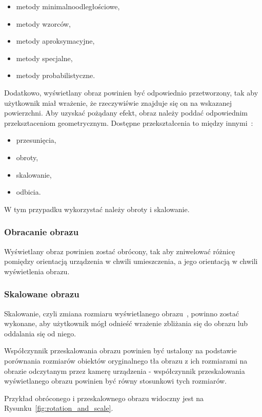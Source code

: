 \begin{itemize}
 \item metody minimalnoodległościowe,
 \item metody wzorców,
 \item metody aproksymacyjne,
 \item metody specjalne,
 \item metody probabilistyczne.
\end{itemize}


Dodatkowo, wyświetlany obraz powinien być odpowiednio przetworzony, tak aby użytkownik miał wrażenie, że rzeczywiświe znajduje się on na wskazanej powierzchni.
Aby uzyskać pożądany efekt, obraz należy poddać odpowiednim przeksztaceniom geometrycznym.
Dostępne przekształcenia to między innymi~\cite{anal:przet:obr}:
\begin{itemize}
 \item przesunięcia,
 \item obroty,
 \item skalowanie,
 \item odbicia.
\end{itemize}

W tym przypadku wykorzystać należy obroty i skalowanie.

\subsubsection{Obracanie obrazu}
Wyświetlany obraz powinien zostać obrócony, tak aby zniwelować różnicę pomiędzy orientacją urządzenia w chwili umieszczenia, a jego orientacją w chwili wyświetlenia obrazu.


\subsubsection{Skalowane obrazu}
Skalowanie, czyli zmiana rozmiaru wyświetlanego obrazu~\cite{geo:tools}, powinno zostać wykonane, aby użytkownik mógł odnieść wrażenie zbliżania się do obrazu lub oddalania się od niego.

Współczynnik przeskalowania obrazu powinien być ustalony na podstawie porównania rozmiarów obiektów oryginalnego tła obrazu z ich rozmiarami na obrazie odczytanym przez kamerę urządzenia - współczynnik przeskalowania wyświetlanego obrazu powinien być równy stosunkowi tych rozmiarów.

Przykład obróconego i przeskalownego obrazu widoczny jest na Rysunku~\ref{fig:rotation_and_scale}.



